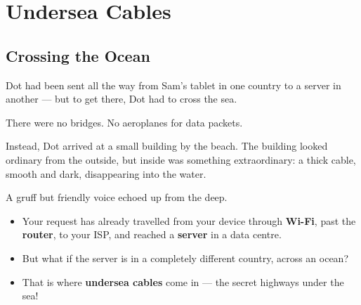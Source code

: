 
\chapter{Undersea Cables}


\section*{Crossing the Ocean}

Dot had been sent all the way from Sam's tablet in one country
to a server in another — but to get there, Dot had to cross the sea.

There were no bridges.
No aeroplanes for data packets.

Instead, Dot arrived at a small building by the beach.
The building looked ordinary from the outside, but inside was something extraordinary:
a thick cable, smooth and dark, disappearing into the water.

A gruff but friendly voice echoed up from the deep.


\sectionrule


\begin{tcolorbox}[enhanced,colback=SunYellow!12,colframe=SunYellow!70!black,arc=6pt,boxrule=1pt,
  fonttitle=\bfseries\large, title={\faRetweet\quad Remember So Far}]
  \begin{itemize}
    \item Your request has already travelled from your device through \textbf{Wi-Fi}, past the \textbf{router}, to your ISP, and reached a \textbf{server} in a data centre.
    \item But what if the server is in a completely different country, across an ocean?
    \item That is where \textbf{undersea cables} come in — the secret highways under the sea!
  \end{itemize}
\end{tcolorbox}

